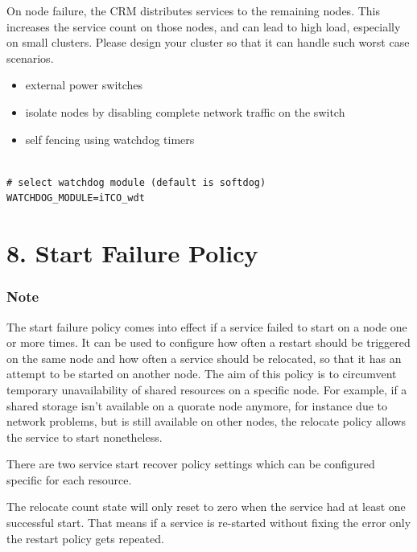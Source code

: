 On node failure, the CRM distributes services to the remaining nodes. This increases the service count on those nodes, and can lead to high load, especially on small clusters. Please design your cluster so that it can handle such worst case scenarios.

\begin{itemize}[leftmargin=2cm]

	\item external power switches

	\item isolate nodes by disabling complete network traffic on the switch

	\item self fencing using watchdog timers

\end{itemize}

\begin{lstlisting}

# select watchdog module (default is softdog)
WATCHDOG_MODULE=iTCO_wdt

\end{lstlisting}


\section{8. Start Failure Policy}

\subsubsection{Note}

The start failure policy comes into effect if a service failed to start on a node one or more times. It can be used to configure how often a restart should be triggered on the same node and how often a service should be relocated, so that it has an attempt to be started on another node. The aim of this policy is to circumvent temporary unavailability of shared resources on a specific node. For example, if a shared storage isn’t available on a quorate node anymore, for instance due to network problems, but is still available on other nodes, the relocate policy allows the service to start nonetheless.

There are two service start recover policy settings which can be configured specific for each resource.

The relocate count state will only reset to zero when the service had at least one successful start. That means if a service is re-started without fixing the error only the restart policy gets repeated.


